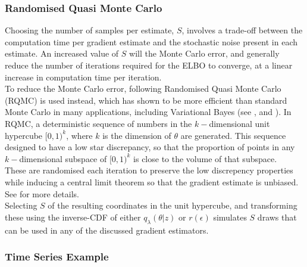 \documentclass[
12pt, %
onehalfspacing, %
nohyperref, %
headsepline, %
chapterinoneline, %
]{MastersDoctoralThesis} %
\begin{document}
\subsubsection{Randomised Quasi Monte Carlo}
\label{subsubsec:SVBRQMC}

Choosing the number of samples per estimate, $S$, involves a trade-off between the computation time per gradient estimate and the stochastic noise present in each estimate. An increased value of $S$ will the Monte Carlo error, and generally reduce the number of iterations required for the ELBO to converge, at a linear increase in computation time per iteration.
\\

To reduce the Monte Carlo error, following \citet{Gunawan2017} Randomised Quasi Monte Carlo (RQMC) is used instead, which has shown to be more efficient than standard Monte Carlo in many applications, including Variational Bayes (see \cite{Niederreiter1992, Caflisch1998}, and \cite{Buchholz2018}). In RQMC, a deterministic sequence of numbers in the $k-$dimensional unit hypercube $[0, 1)^k$, where $k$ is the dimension of $\theta$ are generated. This sequence designed to have a low star discrepancy, so that the proportion of points in any $k-$dimensional subspace of $[0, 1)^k$ is close to the volume of that subspace.
\\

These are randomised each iteration to preserve the low discrepency properties while inducing a central limit theorem so that the gradient estimate is unbiased. See \citet{Matousek1998} for more details.
\\

Selecting $S$ of the resulting coordinates in the unit hypercube, and transforming these using the inverse-CDF of either $q_{\lambda}(\theta | z)$ or $r(\epsilon)$ simulates $S$ draws that can be used in any of the discussed gradient estimators.

\subsubsection{Time Series Example}
\label{subsubsec:SVBTS}
\end{document}
